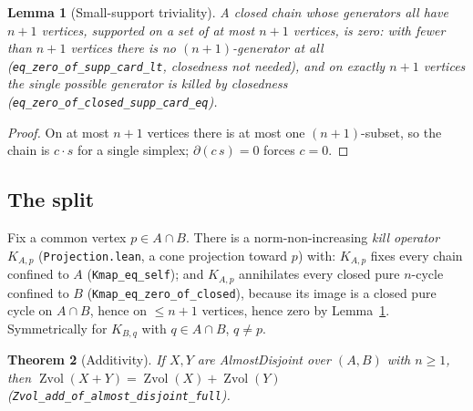 \documentclass[11pt]{article}
\theoremstyle{plain}
\newtheorem{theorem}{Theorem}[section]
\newtheorem{lemma}[theorem]{Lemma}
\theoremstyle{definition}
\theoremstyle{remark}
\newcommand{\Zvol}{\operatorname{Zvol}}
\newcommand{\bd}{\partial}
\newcommand{\code}[1]{\texttt{#1}}
\begin{document}
\begin{lemma}[Small-support triviality]\label{lem:smallsupp}
A closed chain whose generators all have $n+1$ vertices, supported on a set of at most
$n+1$ vertices, is zero: with fewer than $n+1$ vertices there is no $(n{+}1)$-generator at all
(\code{eq\_zero\_of\_supp\_card\_lt}, closedness not needed), and on exactly $n+1$ vertices the
single possible generator is killed by closedness (\code{eq\_zero\_of\_closed\_supp\_card\_eq}).
\end{lemma}

\begin{proof}
On at most $n+1$ vertices there is at most one $(n{+}1)$-subset, so the chain is $c\cdot s$
for a single simplex; $\bd(c\,s)=0$ forces $c=0$.
\end{proof}

\subsection*{The split}

Fix a common vertex $p\in A\cap B$. There is a norm-non-increasing \emph{kill operator}
$K_{A,p}$ (\code{Projection.lean}, a cone projection toward $p$) with: $K_{A,p}$ fixes every
chain confined to $A$ (\code{Kmap\_eq\_self}); and $K_{A,p}$ annihilates every closed pure
$n$-cycle confined to $B$ (\code{Kmap\_eq\_zero\_of\_closed}), because its image is a closed
pure cycle on $A\cap B$, hence on $\le n+1$ vertices, hence zero by
Lemma~\ref{lem:smallsupp}. Symmetrically for $K_{B,q}$ with $q\in A\cap B$, $q\neq p$.

\begin{theorem}[Additivity]\label{thm:add}
If $X,Y$ are AlmostDisjoint over $(A,B)$ with $n\ge 1$, then
$\Zvol(X+Y)=\Zvol(X)+\Zvol(Y)$ (\code{Zvol\_add\_of\_almost\_disjoint\_full}).
\end{theorem}
\end{document}
